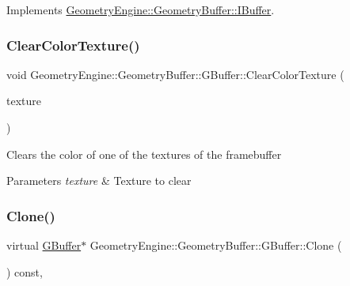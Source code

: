 Implements \mbox{\hyperlink{class_geometry_engine_1_1_geometry_buffer_1_1_i_buffer_ab4c82eeb6d07ea902e0de3fad67c29f2}{Geometry\+Engine\+::\+Geometry\+Buffer\+::\+I\+Buffer}}.

\mbox{\label{class_geometry_engine_1_1_geometry_buffer_1_1_g_buffer_abf39c85cb87eaf0475205b59333253c0}} 
\subsubsection{\texorpdfstring{ClearColorTexture()}{ClearColorTexture()}}
{\footnotesize\ttfamily void Geometry\+Engine\+::\+Geometry\+Buffer\+::\+G\+Buffer\+::\+Clear\+Color\+Texture (\begin{DoxyParamCaption}\item[{\mbox{\hyperlink{class_geometry_engine_1_1_geometry_buffer_1_1_g_buffer_a718dceafcac1915f7de061108597e1cc}{G\+B\+U\+F\+F\+E\+R\+\_\+\+T\+E\+X\+T\+U\+R\+E\+\_\+\+T\+Y\+PE}}}]{texture }\end{DoxyParamCaption})}

Clears the color of one of the textures of the framebuffer 
\begin{DoxyParams}{Parameters}
{\em texture} & Texture to clear \\
\hline
\end{DoxyParams}
\mbox{\label{class_geometry_engine_1_1_geometry_buffer_1_1_g_buffer_af993f8c23f7e78051f3071be4873af9d}} 
\subsubsection{\texorpdfstring{Clone()}{Clone()}}
{\footnotesize\ttfamily virtual \mbox{\hyperlink{class_geometry_engine_1_1_geometry_buffer_1_1_g_buffer}{G\+Buffer}}$\ast$ Geometry\+Engine\+::\+Geometry\+Buffer\+::\+G\+Buffer\+::\+Clone (\begin{DoxyParamCaption}{ }\end{DoxyParamCaption}) const\hspace{0.3cm}{\ttfamily [inline]}, {\ttfamily [virtual]}}


